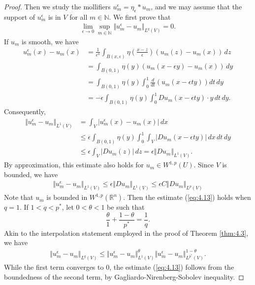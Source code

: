 \documentclass{article}
\numberwithin{equation}{section}
\newcommand{\bbN}{\mathbb{N}}
\newcommand{\bbR}{\mathbb{R}}
\theoremstyle{plain}
\theoremstyle{definition}
\begin{document}
\begin{proof}
Then we study the mollifiers $u_m^\epsilon=\eta_\epsilon*u_m$, and we may assume that the support of $u_m^\epsilon$ is in $V$ for all $m\in\bbN$. We first prove that
\begin{align}
	\lim_{\epsilon\to 0}\sup_{m\in\bbN}\Vert u_m^\epsilon-u_m\Vert_{L^q(V)}= 0.\label{eq:4.13}
\end{align}
If $u_m$ is smooth, we have
\begin{align*}
	u_m^\epsilon(x)-u_m(x)&=\frac{1}{\epsilon^n}\int_{B(x,\epsilon)}\eta\left(\frac{x-z}{\epsilon}\right)(u_m(z)-u_m(x))\,dz\\
	&=\int_{B(0,1)}\eta(y)\left(u_m(x-\epsilon y)-u_m(x)\right)\,dy\\
	&=\int_{B(0,1)}\eta(y)\int_0^1\frac{d}{dt}\left(u_m(x-\epsilon ty)\right)dt\,dy\\
	&=-\epsilon\int_{B(0,1)}\eta(y)\int_0^1 Du_m(x-\epsilon t y)\cdot y\,dt\,dy.
\end{align*}
Consequently,
\begin{align*}
	\Vert u^\epsilon_m-u_m\Vert_{L^1(V)}&=\int_V\vert u_m^\epsilon(x)-u_m(x)\vert\,dx\\
	&\leq\epsilon\int_{B(0,1)}\eta(y)\int_0^1\int_V\vert Du_m(x-\epsilon ty)\vert\,dx\,dt\,dy\\
	&\leq\epsilon\int_V\vert Du_m(z)\vert\,dz=\epsilon\Vert Du_m\Vert_{L^1(V)}.
\end{align*}
By approximation, this estimate also holds for $u_m\in W^{1,p}(U)$. Since $V$ is bounded, we have
\begin{align*}
	\Vert u^\epsilon_m-u_m\Vert_{L^1(V)}\leq\epsilon\Vert Du_m\Vert_{L^1(V)}\leq\epsilon C\Vert Du_m\Vert_{L^p(V)}
\end{align*}
Note that $u_m$ is bounded in $W^{1,p}(\bbR^n)$. Then the estimate (\ref{eq:4.13}) holds when $q=1$. If $1<q< p^*$, let $0<\theta<1$ be such that $$\frac{\theta}{1}+\frac{1-\theta}{p^*}=\frac{1}{q}.$$ Akin to the interpolation statement employed in the proof of Theorem \ref{thm:4.3}, we have
\begin{align*}
	\Vert u_m^\epsilon-u_m\Vert_{L^q(V)}\leq\Vert u_m^\epsilon-u_m\Vert_{L^1(V)}^\theta\Vert u_m^\epsilon-u_m\Vert_{L^{p^*}(V)}^{1-\theta}.
\end{align*}
While the first term converges to $0$, the estimate (\ref{eq:4.13}) follows from the boundedness of the second term, by Gagliardo-Nirenberg-Sobolev inequality.\vspace{0.15cm}


\end{proof}
\end{document}
